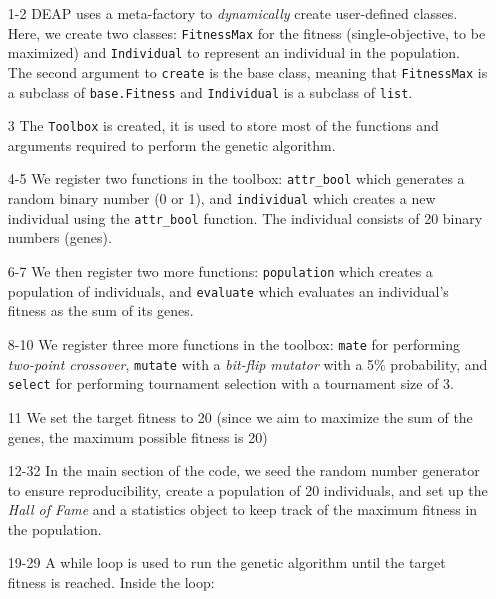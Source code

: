   \begin{enumerate}
    \item[1-2] DEAP uses a meta-factory to \textit{dynamically} create
      user-defined classes.
      Here, we create two classes: \texttt{FitnessMax} for the fitness
      (single-objective, to be maximized) and \texttt{Individual} to represent
      an individual in the population.
      The second argument to \texttt{create} is the base class, meaning that
      \texttt{FitnessMax} is a subclass of \texttt{base.Fitness} and
      \texttt{Individual} is a subclass of \texttt{list}.
    \item[3] The \texttt{Toolbox} is created, it is used to store most of the
      functions and arguments required to perform the genetic algorithm.
    \item[4-5] We register two functions in the toolbox: \texttt{attr\_bool} 
      which generates a random binary number (0 or 1), and \texttt{individual}
      which creates a new individual using the \texttt{attr\_bool} function.
      The individual consists of 20 binary numbers (genes).
    \item[6-7] We then register two more functions: \texttt{population} which
      creates a population of individuals, and \texttt{evaluate} which evaluates
      an individual's fitness as the sum of its genes.
    \item[8-10] We register three more functions in the toolbox: \texttt{mate}
      for performing \textit{two-point crossover}, \texttt{mutate} with a
      \textit{bit-flip mutator} with a 5\% probability, and \texttt{select}
      for performing tournament selection with a tournament size of 3.
    \item[11] We set the target fitness to 20 (since we aim to maximize the sum
      of the genes, the maximum possible fitness is 20) 
    \item[12-32] In the main section of the code, we seed the random number
      generator to ensure reproducibility, create a population of 20
      individuals, and set up the \textit{Hall of Fame} and a statistics object
      to keep track of the maximum fitness in the population.
    \item[19-29] A while loop is used to run the genetic algorithm until the
      target fitness is reached.
      Inside the loop:


\end{enumerate}
